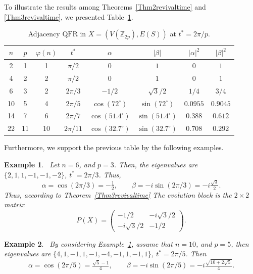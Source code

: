 \documentclass[12pt]{amsart}
\newtheorem{example}{Example}[section]
\newcommand{\QFR}{\mathrm{QFR}}
\begin{document}
To illustrate the results among Theorems~\ref{Thm2revivaltime} and \ref{Thm3revivaltime}, we presented Table~\ref{tabtime01}.
\begin{table}[H]
\centering
\begin{tabular}{@{}|c|c|c|c|c|c|c|c|@{}}
\hline
$n$ & $p$ & $\varphi(n)$ & $t^*$ & $\alpha$ & $|\beta|$ & $|\alpha|^2$ & $|\beta|^2$ \\
\hline
2  & 1 & 1 & $\pi/2$    & $0$       & $1$      & $0$     & $1$     \\ \hline
4  & 2 & 2 & $\pi/2$    & $0$       & $1$      & $0$     & $1$     \\\hline
6  & 3 & 2 & $2\pi/3$   & $-1/2$    & $\sqrt{3}/2$ & $1/4$ & $3/4$ \\\hline
10 & 5 & 4 & $2\pi/5$   & $\cos(72^\circ)$ & $\sin(72^\circ)$ & $ 0.0955$ & $ 0.9045$ \\\hline
14 & 7 & 6 & $2\pi/7$   & $\cos(51.4^\circ)$ & $\sin(51.4^\circ)$ & $ 0.388$ & $ 0.612$ \\\hline
22 & 11& 10& $2\pi/11$  & $\cos(32.7^\circ)$ & $\sin(32.7^\circ)$ & $ 0.708$ & $ 0.292$ \\
\hline
\end{tabular}
\caption{Adjacency $\QFR$ in $X=(V(\mathbb{Z}_{2p}),E(S))$ at $t^* = 2\pi/p$.}
\label{tabtime01}
\end{table}

Furthermore, we support the previous table by the following examples.
\begin{example}~\label{exn6}
Let $n = 6$, and $p = 3$. Then, the eigenvalues are $\{2, 1, 1, -1, -1, -2\}$, $t^* = 2\pi/3$. Thus, 
  \[
    \alpha = \cos(2\pi/3) = -\tfrac{1}{2}, \qquad \beta = -i\sin(2\pi/3) = -i\tfrac{\sqrt{3}}{2}.
  \]
Thus, according to Theorem~\ref{Thm3revivaltime}
  The evolution block is the $2\times 2$ matrix
  $$P(X)=\begin{pmatrix}-1/2 & -i\sqrt{3}/2 \\ -i\sqrt{3}/2 & -1/2\end{pmatrix}.$$
\end{example}

\begin{example}~\label{exn10}
By considering Example~\ref{exn6}, assume that $n = 10$, and  $p = 5$, then eigenvalues are $\{4,1,-1,1,-1,-4,-1,1,-1,1\}$, $t^* = 2\pi/5$. Then
  \[
    \alpha = \cos(2\pi/5) = \tfrac{\sqrt{5}-1}{4},\qquad
    \beta  = -i\sin(2\pi/5) = -i\tfrac{\sqrt{10+2\sqrt{5}}}{4}.
  \]
\end{example}
\end{document}
